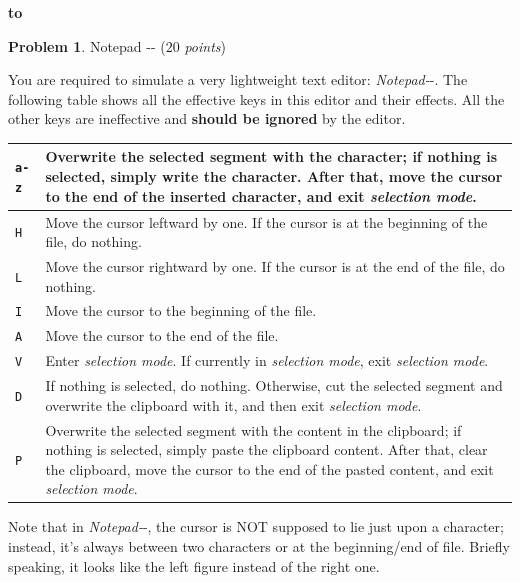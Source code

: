 \documentclass[12pt,a4paper]{report}
\newcommand{\points}[1]{ ($#1$ \textit{points}) }
\theoremstyle{definition}
\newtheorem{problem}{\textbf{Problem}}
\theoremstyle{definition}
\def\headline#1{\hbox to \hsize{\hrulefill\quad\lower.3em\hbox{#1}\quad\hrulefill}}
\def\headline#1{\hbox to \hsize{\hrulefill\quad\lower.3em\hbox{#1}\quad\hrulefill}}
\begin{document}
\vspace{5pt}
\begin{center}
\textbf{\headline{\large Programming Part}}
\end{center}
\begin{problem}Notepad -{}- \points{20}

You are required to simulate a very lightweight text editor: \textit{Notepad-}-. The following table shows all the effective keys in this editor and their effects. All the other keys are ineffective and {\bfseries should be ignored} by the editor.

\begin{table}[h]
\centering
\begin{tabularx}{\textwidth}{|l|X|}
\hline
\texttt{a-z} & Overwrite the selected segment with the character; if nothing is selected, simply write the character. After that, move the cursor to the end of the inserted character, and exit \textit{selection mode}.\\\hline
\texttt{H}   & Move the cursor leftward by one. If the cursor is at the beginning of the file, do nothing.\\\hline
\texttt{L}   & Move the cursor rightward by one. If the cursor is at the end of the file, do nothing.\\\hline
\texttt{I}   & Move the cursor to the beginning of the file.\\\hline
\texttt{A}   & Move the cursor to the end of the file.\\\hline
\texttt{V}   & Enter \textit{selection mode}. If currently in \textit{selection mode}, exit \textit{selection mode}.\\\hline
\texttt{D}   & If nothing is selected, do nothing. Otherwise, cut the selected segment and overwrite the clipboard with it, and then exit \textit{selection mode}.\\\hline
\texttt{P}   & Overwrite the selected segment with the content in the clipboard; if nothing is selected, simply paste the clipboard content. After that, clear the clipboard, move the cursor to the end of the pasted content, and exit \textit{selection mode}.\\\hline
\end{tabularx}
\end{table}

Note that in \textit{Notepad-}-, the cursor is NOT supposed to lie just upon a character; instead, it's always between two characters or at the beginning/end of file. Briefly speaking, it looks like the left figure instead of the right one.\\


\end{problem}
\end{document}
